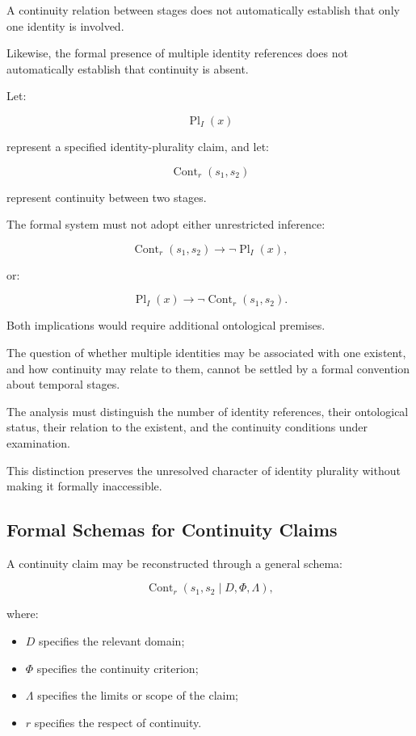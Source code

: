A continuity relation
between stages does not
automatically establish
that only one identity
is involved.

Likewise, the formal
presence of multiple
identity references does
not automatically establish
that continuity is absent.

Let:

\[
    \operatorname{Pl}_{I}(x)
\]

represent a specified
identity-plurality claim,
and let:

\[
    \operatorname{Cont}_{r}(s_1,s_2)
\]

represent continuity
between two stages.

The formal system must
not adopt either unrestricted
inference:

\[
    \operatorname{Cont}_{r}(s_1,s_2)
    \rightarrow
    \neg\operatorname{Pl}_{I}(x),
\]

or:

\[
    \operatorname{Pl}_{I}(x)
    \rightarrow
    \neg\operatorname{Cont}_{r}(s_1,s_2).
\]

Both implications would
require additional ontological
premises.

The question of whether
multiple identities may
be associated with one
existent, and how continuity
may relate to them,
cannot be settled by
a formal convention
about temporal stages.

The analysis must distinguish
the number of identity
references, their ontological
status, their relation
to the existent, and
the continuity conditions
under examination.

This distinction preserves
the unresolved character
of identity plurality
without making it
formally inaccessible.

\subsection{Formal Schemas for Continuity Claims}

A continuity claim may
be reconstructed through
a general schema:

\[
    \operatorname{Cont}_{r}
    (s_1,s_2 \mid D,\Phi,\Lambda),
\]

where:

\begin{itemize}
    \item \(D\) specifies
    the relevant domain;
    \item \(\Phi\) specifies
    the continuity criterion;
    \item \(\Lambda\) specifies
    the limits or scope
    of the claim;
    \item \(r\) specifies
    the respect of continuity.
\end{itemize}

